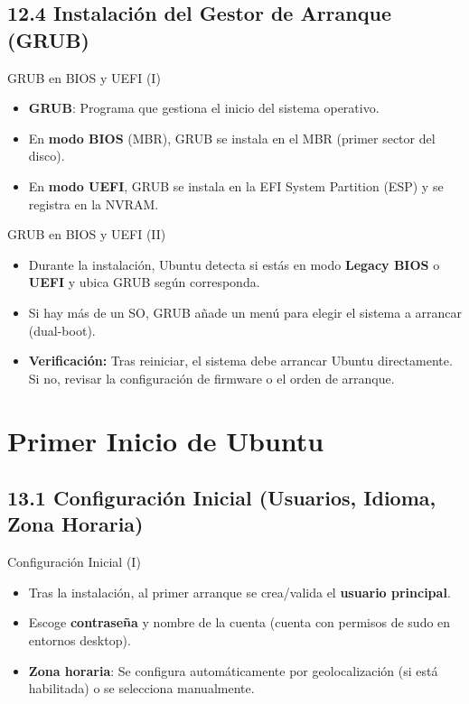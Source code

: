 \documentclass{beamer}
\begin{document}
\subsection{12.4 Instalación del Gestor de Arranque (GRUB)}
\begin{frame}{GRUB en BIOS y UEFI (I)}
    \begin{itemize}
        \item \textbf{GRUB}: Programa que gestiona el inicio del sistema operativo.
        \item En \textbf{modo BIOS} (MBR), GRUB se instala en el MBR (primer sector del disco).
        \item En \textbf{modo UEFI}, GRUB se instala en la EFI System Partition (ESP) y se registra en la NVRAM.
    \end{itemize}
\end{frame}

\begin{frame}{GRUB en BIOS y UEFI (II)}
    \begin{itemize}
        \item Durante la instalación, Ubuntu detecta si estás en modo \textbf{Legacy BIOS} o \textbf{UEFI} y ubica GRUB según corresponda.
        \item Si hay más de un SO, GRUB añade un menú para elegir el sistema a arrancar (dual-boot).
        \item \textbf{Verificación:} Tras reiniciar, el sistema debe arrancar Ubuntu directamente. Si no, revisar la configuración de firmware o el orden de arranque.
    \end{itemize}
\end{frame}

\section{Primer Inicio de Ubuntu}

\subsection{13.1 Configuración Inicial (Usuarios, Idioma, Zona Horaria)}
\begin{frame}{Configuración Inicial (I)}
    \begin{itemize}
        \item Tras la instalación, al primer arranque se crea/valida el \textbf{usuario principal}.
        \item Escoge \textbf{contraseña} y nombre de la cuenta (cuenta con permisos de sudo en entornos desktop).
        \item \textbf{Zona horaria}: Se configura automáticamente por geolocalización (si está habilitada) o se selecciona manualmente.
    \end{itemize}
\end{frame}
\end{document}

